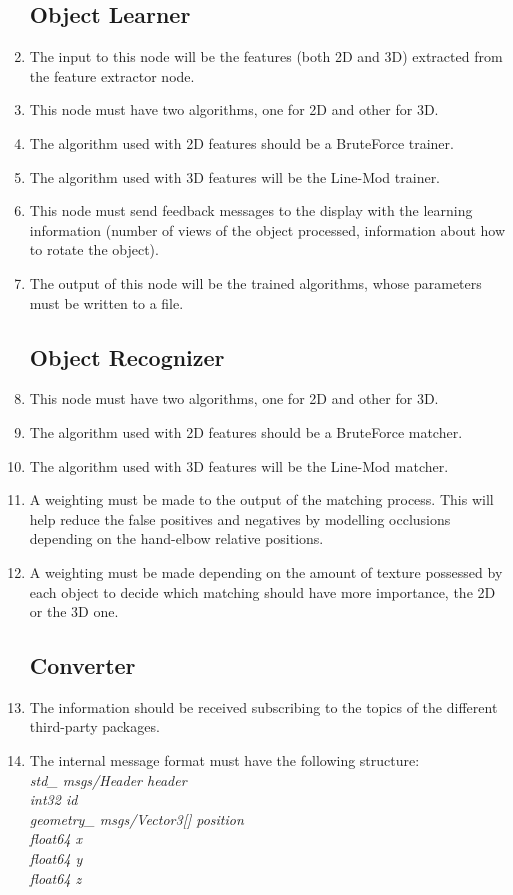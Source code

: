 \documentclass{article}
\makeatletter
\def\threedigits#1{\expandafter\@threedigits\csname c@#1\endcsname}
\def\@threedigits#1{%
  \ifnum#1<100 0\fi
  \ifnum#1<10 0\fi
  \number#1}
\makeatother
\begin{document}
\begin{enumerate}[label=\textbf{FR\threedigits*}, leftmargin=2cm]
\subsection{Object Learner}
	\item The input to this node will be the features (both 2D and 3D) extracted from the feature extractor node. 
	\item This node must have two algorithms, one for 2D and other for 3D. 
	\item The algorithm used with 2D features should be a BruteForce trainer.
	\item The algorithm used with 3D features will be the Line-Mod trainer. 	
	\item This node must send feedback messages to the display with the learning information (number of views of the object processed, information about how to rotate the object).
	\item The output of this node will be the trained algorithms, whose parameters must be written to a file. 

\subsection{Object Recognizer}
	\item This node must have two algorithms, one for 2D and other for 3D. 
	\item The algorithm used with 2D features should be a BruteForce matcher.
	\item The algorithm used with 3D features will be the Line-Mod matcher. 
	\item A weighting must be made to the output of the matching process. This will help reduce the false positives and negatives by modelling occlusions depending on the hand-elbow relative positions. 
	\item A weighting must be made depending on the amount of texture possessed by each object to decide which matching should have more importance, the 2D or the 3D one. 



\subsection{Converter}

\item The information should be received subscribing to the topics of the different third-party packages. 
\item The internal message format must have the following structure: \\[0.3cm]
\textit{
std\_ msgs/Header header\\[0.1cm]
int32 id\\[0.1cm]
geometry\_ msgs/Vector3[] position\\
\hspace*{0.5cm}float64 x\\
\hspace*{0.5cm}float64 y\\
\hspace*{0.5cm}float64 z\\
}



\end{enumerate}
\end{document}
